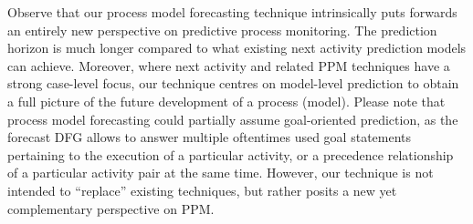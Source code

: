 Observe that our process model forecasting technique intrinsically puts forwards an entirely new perspective on predictive process monitoring. The prediction horizon is much longer compared to what existing next activity prediction models can achieve. Moreover, where next activity and related PPM techniques have a strong case-level focus, our technique centres on model-level prediction to obtain a full picture of the future development of a process (model). Please note that process model forecasting could partially assume goal-oriented prediction, as the forecast DFG allows to answer multiple oftentimes used goal statements pertaining to the execution of a particular activity, or a precedence relationship of a particular activity pair \cite{DBLP:journals/tkdd/TeinemaaDRM19} at the same time. However, our technique is not intended to ``replace'' existing techniques, but rather posits a new yet complementary perspective on PPM.

